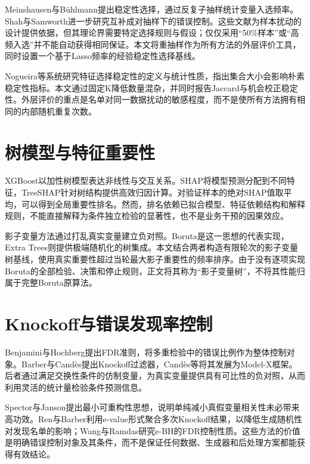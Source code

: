 \documentclass{sufethesismas}
\begin{document}
Meinshausen与Bühlmann提出稳定性选择，通过反复子抽样统计变量入选频率\cite{stability2010}。Shah与Samworth进一步研究互补成对抽样下的错误控制\cite{cpss2013}。这些文献为样本扰动的设计提供依据，但其理论界需要特定选择规则与假设；仅仅采用``50\%样本''或``高频入选''并不能自动获得相同保证。本文将重抽样作为所有方法的外层评价工具，同时设置一个基于Lasso频率的经验稳定性选择基线。

Nogueira等系统研究特征选择稳定性的定义与统计性质，指出集合大小会影响朴素稳定性指标\cite{nogueira2018}。本文通过固定K降低数量混杂，并同时报告Jaccard与机会校正稳定性。外层评价的重点是名单对同一数据扰动的敏感程度，而不是使所有方法拥有相同的内部随机重复次数。

\section{树模型与特征重要性}

XGBoost以加性树模型表达非线性与交互关系\cite{xgb2016}。SHAP将模型预测分配到不同特征，TreeSHAP针对树结构提供高效归因计算\cite{shap2017,treeshap2020}。对验证样本的绝对SHAP值取平均，可以得到全局重要性排名。然而，排名依赖已拟合模型、特征依赖结构和解释规则，不能直接解释为条件独立检验的显著性，也不是业务干预的因果效应。

影子变量方法通过打乱真实变量建立负对照。Boruta是这一思想的代表实现\cite{boruta2010}，Extra Trees则提供极端随机化的树集成\cite{extratrees2006}。本文结合两者构造有限轮次的影子变量树基线，使用真实重要性超过当轮最大影子重要性的频率排序。由于没有逐项实现Boruta的全部检验、决策和停止规则，正文将其称为``影子变量树''，不将其性能归属于完整Boruta原算法。

\section{Knockoff与错误发现率控制}

Benjamini与Hochberg提出FDR准则，将多重检验中的错误比例作为整体控制对象\cite{bh1995}。Barber与Candès提出Knockoff过滤器\cite{knockoff2015}，Candès等将其发展为Model-X框架\cite{modelx2018}。后者通过满足交换性条件的仿制变量，为真实变量提供具有可比性的负对照，从而利用灵活的统计量检验条件预测信息。

Spector与Janson提出最小可重构性思想，说明单纯减小真假变量相关性未必带来高功效\cite{mvr2022}。Ren与Barber利用e-value形式聚合多次Knockoff结果，以降低生成随机性对发现名单的影响\cite{derand2024}；Wang与Ramdas研究e-BH的FDR控制性质\cite{ebh2022}。这些方法的价值是明确错误控制对象及其条件，而不是保证任何数据、生成器和后处理方案都能获得有效结论。
\end{document}

